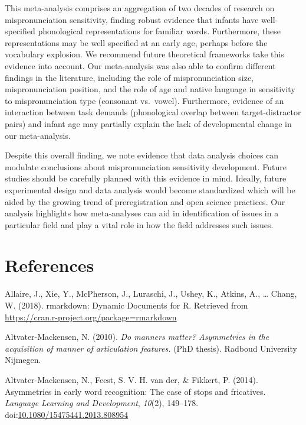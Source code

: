 \documentclass[man, noextraspace]{apa6}
\begin{document}
This meta-analysis comprises an aggregation of two decades of research on mispronunciation sensitivity, finding robust evidence that infants have well-specified phonological representations for familiar words. Furthermore, these representations may be well specified at an early age, perhaps before the vocabulary explosion. We recommend future theoretical frameworks take this evidence into account. Our meta-analysis was also able to confirm different findings in the literature, including the role of mispronunciation size, mispronunciation position, and the role of age and native language in sensitivity to mispronunciation type (consonant vs.~vowel). Furthermore, evidence of an interaction between task demands (phonological overlap between target-distractor pairs) and infant age may partially explain the lack of developmental change in our meta-analysis.

Despite this overall finding, we note evidence that data analysis choices can modulate conclusions about mispronunciation sensitivity development. Future studies should be carefully planned with this evidence in mind. Ideally, future experimental design and data analysis would become standardized which will be aided by the growing trend of preregistration and open science practices. Our analysis highlights how meta-analyses can aid in identification of issues in a particular field and play a vital role in how the field addresses such issues.

\newpage

\hypertarget{references}{%
\section{References}\label{references}}

\begingroup
\setlength{\parindent}{-0.5in}
\setlength{\leftskip}{0.5in}

\hypertarget{refs}{}
\leavevmode\hypertarget{ref-RMarkdown}{}%
Allaire, J., Xie, Y., McPherson, J., Luraschi, J., Ushey, K., Atkins, A., \ldots{} Chang, W. (2018). rmarkdown: Dynamic Documents for R. Retrieved from \url{https://cran.r-project.org/package=rmarkdown}

\leavevmode\hypertarget{ref-Altvater2010}{}%
Altvater-Mackensen, N. (2010). \emph{Do manners matter? Asymmetries in the acquisition of manner of articulation features.} (PhD thesis). Radboud University Nijmegen.

\leavevmode\hypertarget{ref-Altvater2014}{}%
Altvater-Mackensen, N., Feest, S. V. H. van der, \& Fikkert, P. (2014). Asymmetries in early word recognition: The case of stops and fricatives. \emph{Language Learning and Development}, \emph{10}(2), 149--178. doi:\href{https://doi.org/10.1080/15475441.2013.808954}{10.1080/15475441.2013.808954}
\end{document}
